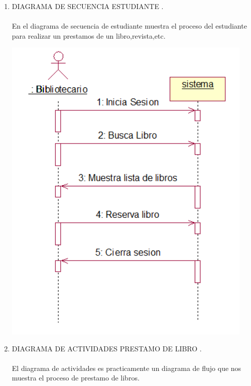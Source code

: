 \begin{enumerate}[1.]
\newpage
	\item DIAGRAMA DE SECUENCIA ESTUDIANTE .\\\\
	En el diagrama de secuencia de estudiante muestra el proceso del estudiante  para realizar un prestamos de un libro,revista,etc.\\
	\begin{center}
	\includegraphics[width=12cm]{./Imagenes/img5} 
	\end{center}
	\newpage
\item DIAGRAMA DE ACTIVIDADES PRESTAMO DE LIBRO .\\\\
    El diagrama de actividades es practicamente un diagrama de flujo que nos muestra el proceso de prestamo de libros.
	\begin{center}

\end{center}
\end{enumerate}
